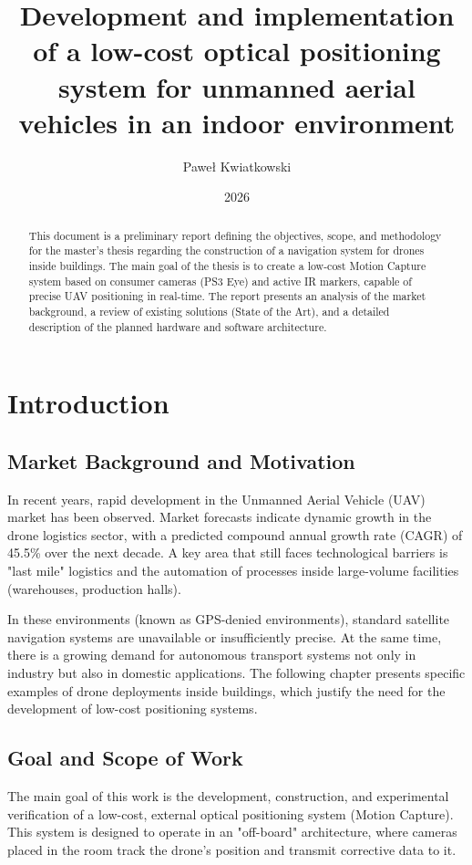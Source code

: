 \documentclass{EE-dyplom}
\title{Development and implementation of a low-cost optical positioning system for unmanned aerial vehicles in an indoor environment}
\author{Paweł Kwiatkowski}
\date{2026}
\begin{document}
\sloppy
\maketitle

\newpage
{}
\setcounter{page}{1}

\begin{abstract}
This document is a preliminary report defining the objectives, scope, and methodology for the master's thesis regarding the construction of a navigation system for drones inside buildings. The main goal of the thesis is to create a low-cost Motion Capture system based on consumer cameras (PS3 Eye) and active IR markers, capable of precise UAV positioning in real-time. The report presents an analysis of the market background, a review of existing solutions (State of the Art), and a detailed description of the planned hardware and software architecture.
\end{abstract}

\newpage
\tableofcontents
\newpage

\section{Introduction}

\subsection{Market Background and Motivation}
In recent years, rapid development in the Unmanned Aerial Vehicle (UAV) market has been observed. Market forecasts indicate dynamic growth in the drone logistics sector, with a predicted compound annual growth rate (CAGR) of 45.5\% over the next decade. A key area that still faces technological barriers is "last mile" logistics and the automation of processes inside large-volume facilities (warehouses, production halls).

In these environments (known as GPS-denied environments), standard satellite navigation systems are unavailable or insufficiently precise. At the same time, there is a growing demand for autonomous transport systems not only in industry but also in domestic applications. The following chapter presents specific examples of drone deployments inside buildings, which justify the need for the development of low-cost positioning systems.

\subsection{Goal and Scope of Work}
The main goal of this work is the development, construction, and experimental verification of a low-cost, external optical positioning system (Motion Capture). This system is designed to operate in an "off-board" architecture, where cameras placed in the room track the drone's position and transmit corrective data to it.
\end{document}

